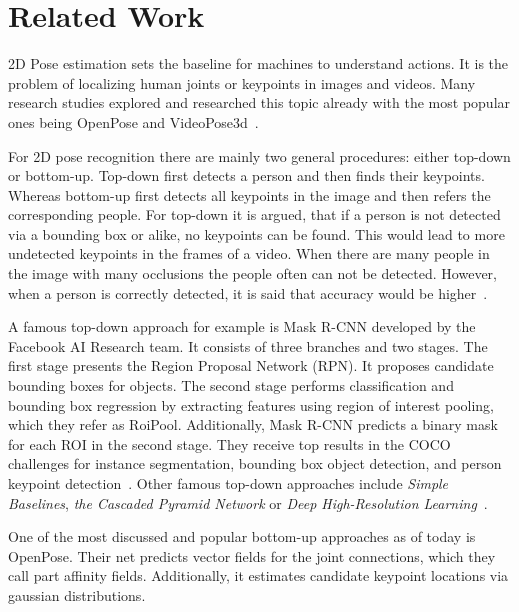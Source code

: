     \section{Related Work}

    2D Pose estimation sets the baseline for machines to understand actions.
    It is the problem of localizing human joints or keypoints in images and videos.
    Many research studies explored and researched this topic already with the most popular ones being OpenPose
    and VideoPose3d~\cite{openpose, videopose3d}.\\
    \par
    For 2D pose recognition there are mainly two general procedures: either top-down or bottom-up.
    Top-down first detects a person and then finds their keypoints.
    Whereas bottom-up first detects all keypoints in the image and then refers the corresponding people.
    For top-down it is argued, that if a person is not detected via a bounding box or alike, no keypoints can be
    found.
    This would lead to more undetected keypoints in the frames of a video.
    When there are many people in the image with many occlusions the people often can not be detected.
    However, when a person is correctly detected, it is said that accuracy would be higher~\cite{synergetic}.\\
    \par
    A famous top-down approach for example is Mask R-CNN developed by the Facebook AI Research team. It consists
    of three branches and two stages.
    The first stage presents the Region Proposal Network (RPN). It proposes candidate bounding boxes for objects.
    The second stage performs classification and bounding box regression by extracting features using region of
    interest pooling, which they refer as RoiPool.
    Additionally, Mask R-CNN predicts a binary mask for each ROI in the second stage.
    They receive top results in the COCO challenges for instance segmentation, bounding box object detection, and
    person keypoint detection~\cite{maskrcnn}.
    Other famous top-down approaches include \textit{Simple Baselines}, \textit{the Cascaded Pyramid Network} or
    \textit{Deep High-Resolution Learning}~\cite{simplebaselines,pyramidnetwork, highres}.\\
    \par
    One of the most discussed and popular bottom-up approaches as of today is OpenPose.
    Their net predicts vector fields for the joint connections, which they call part affinity fields.
    Additionally, it estimates candidate keypoint locations via gaussian distributions.
